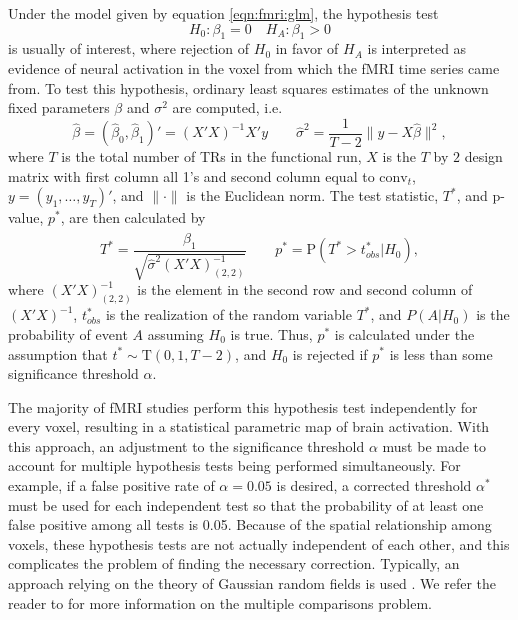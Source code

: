 Under the model given by equation \eqref{eqn:fmri:glm}, the hypothesis test
\begin{equation}
H_0: \beta_1 = 0 \quad H_A: \beta_1 > 0 \label{eqn:fmri:hyp}
\end{equation}
is usually of interest, where rejection of $H_0$ in favor of $H_A$ is interpreted as evidence of neural activation in the voxel from which the fMRI time series came from. To test this hypothesis, ordinary least squares estimates of the unknown fixed parameters $\beta$ and $\sigma^2$ are computed, i.e.
\begin{equation}
\hat{\beta}  = (\hat{\beta}_0,\hat{\beta}_1)' = (X'X)^{-1}X'y \qquad \hat{\sigma}^2 = \frac{1}{T-2}\lVert y-X\hat{\beta} \rVert^2, \label{eqn:fmri:ols}
\end{equation}
where $T$ is the total number of TRs in the functional run, $X$ is the $T$ by $2$ design matrix with first column all 1's and second column equal to $\mbox{conv}_t$, $y = (y_1,\ldots,y_T)'$, and $\lVert\cdot\rVert$ is the Euclidean norm. The test statistic, $T^*$, and p-value, $p^*$, are then calculated by
\begin{equation}
T^* = \frac{\hat{\beta}_1}{\sqrt{\hat{\sigma}^2(X'X)_{(2,2)}^{-1}}} \qquad p^* = \mbox{P}(T^* > t^*_{obs}|H_0), \label{eqn:fmri:ttest}
\end{equation}
where $(X'X)_{(2,2)}^{-1}$ is the element in the second row and second column of $(X'X)^{-1}$, $t^*_{obs}$ is the realization of the random variable $T^*$, and $P(A|H_0)$ is the probability of event $A$ assuming $H_0$ is true. Thus, $p^*$ is calculated under the assumption that $t^* \sim \mbox{T}(0,1,T-2)$, and $H_0$ is rejected if $p^*$ is less than some significance threshold $\alpha$.

The majority of fMRI studies perform this hypothesis test independently for every voxel, resulting in a statistical parametric map of brain activation. With this approach, an adjustment to the significance threshold $\alpha$ must be made to account for multiple hypothesis tests being performed simultaneously. For example, if a false positive rate of $\alpha = 0.05$ is desired, a corrected threshold $\alpha^*$ must be used for each independent test so that the probability of at least one false positive among all tests is 0.05. Because of the spatial relationship among voxels, these hypothesis tests are not actually independent of each other, and this complicates the problem of finding the necessary correction. Typically, an approach relying on the theory of Gaussian random fields is used \citep{wors:grf:1995,wors:mar:cerebral:1996,wors:evans:cerebral:1992,friston:frith:JCBFM:1991}. We refer the reader to \citet[Chapter 6,][]{ashby:fmri:2011} for more information on the multiple comparisons problem.

